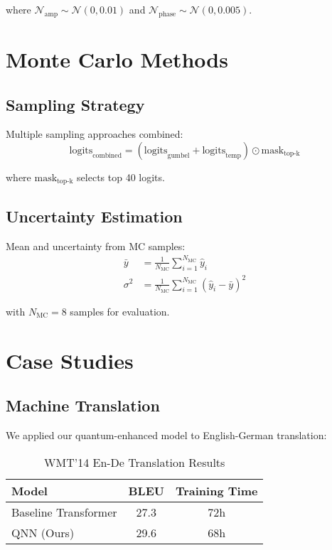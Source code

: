 \documentclass{article}
\begin{document}
where $\mathcal{N}_{\text{amp}} \sim \mathcal{N}(0,0.01)$ and $\mathcal{N}_{\text{phase}} \sim \mathcal{N}(0,0.005)$.

\section{Monte Carlo Methods}

\subsection{Sampling Strategy}
Multiple sampling approaches combined:
\begin{equation}
\text{logits}_{\text{combined}} = (\text{logits}_{\text{gumbel}} + \text{logits}_{\text{temp}}) \odot \text{mask}_{\text{top-k}}
\end{equation}

where $\text{mask}_{\text{top-k}}$ selects top 40 logits.

\subsection{Uncertainty Estimation}
Mean and uncertainty from MC samples:
\begin{align*}
\bar{y} &= \frac{1}{N_{\text{MC}}}\sum_{i=1}^{N_{\text{MC}}} \hat{y}_i \\
\sigma^2 &= \frac{1}{N_{\text{MC}}}\sum_{i=1}^{N_{\text{MC}}}(\hat{y}_i - \bar{y})^2
\end{align*}

with $N_{\text{MC}}=8$ samples for evaluation.

\section{Case Studies}

\subsection{Machine Translation}
We applied our quantum-enhanced model to English-German translation:

\begin{table}[h]
\centering
\begin{tabular}{lcc}
\hline
Model & BLEU & Training Time \\
\hline
Baseline Transformer & 27.3 & 72h \\
QNN (Ours) & 29.6 & 68h \\
\hline
\end{tabular}
\caption{WMT'14 En-De Translation Results}
\end{table}
\end{document}

